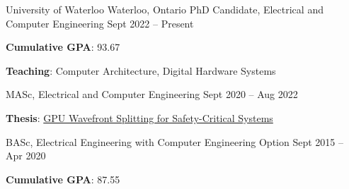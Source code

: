 

\begin{cventries}

\begin{cventrymulti}
{University of Waterloo}
{Waterloo, Ontario}
\cvposition
{PhD Candidate, Electrical and Computer Engineering}
{Sept 2022 -- Present}
{
  \begin{cvitems} %
    \item \textbf{Cumulative GPA}: 93.67
    \item \textbf{Teaching}: Computer Architecture, Digital Hardware Systems
  \end{cvitems}
}
\cvposition
{MASc, Electrical and Computer Engineering}
{Sept 2020 -- Aug 2022}
{
  \begin{cvitems} %
    \item \textbf{Thesis}: \href{https://uwspace.uwaterloo.ca/handle/10012/18872}{GPU Wavefront Splitting for Safety-Critical Systems}
  \end{cvitems}
}
\cvposition
{BASc, Electrical Engineering with Computer Engineering Option}
{Sept 2015 -- Apr 2020}
{
  \begin{cvitems}
    \item \textbf{Cumulative GPA}: 87.55
  \end{cvitems}
}
\end{cventrymulti}

\end{cventries}
